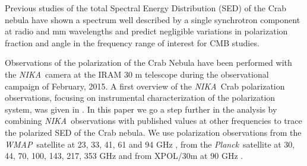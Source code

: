\documentclass[twocolumn,traditabstract]{aa}
\def\NIKA{\textit{NIKA}}
\def\Planck{\textit{Planck}}
\def\WMAP{\textit{WMAP}}
\begin{document}
Previous studies \citep{macias2010} of the total Spectral Energy Distribution
(SED) of the Crab nebula have shown a spectrum well described by a single
synchrotron component at radio and mm wavelengths and predict negligible
variations in polarization fraction and angle in the frequency range of interest
for CMB studies.
 
Observations of the polarization of the Crab Nebula have been performed with the
\NIKA\ camera \citep{monfardini2010,catalano2014,monfardini2014} at the IRAM 30
m telescope during the observational campaign of February, 2015. A first
overview of the \NIKA\ Crab polarization observations, focusing on instrumental characterization of the polarization system, was given in
\cite{2016JLTP..184..724R}. In this paper we go a step further in the analysis
by combining \NIKA\ observations with published values at other frequencies to trace the
polarized SED of the Crab nebula. We use polarization observations from the \WMAP\
satellite at 23, 33, 41, 61 and 94 GHz \citep{2011ApJS..192...19W}, from the
\Planck\ satellite at 30, 44, 70, 100, 143, 217, 353 GHz and from XPOL/30m at 90 GHz
\citep{aumont2010}. 
\end{document}
